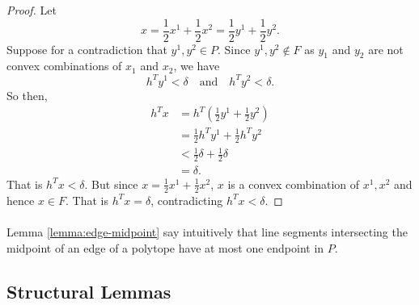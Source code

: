 \begin{proof}
Let $$x = \frac{1}{2}x^1 + \frac{1}{2} x^2 = \frac{1}{2} y^1 + \frac{1}{2}y^2.$$ Suppose for a contradiction that $y^1,y^2 \in P$. Since $y^1, y^2 \not\in F$ as $y_1$ and $y_2$ are not convex combinations of $x_1$ and $x_2$, we have
$$h^Ty^1 < \delta \quad\text{and}\quad h^Ty^2 < \delta. $$
So then,
\begin{align*}
h^Tx &= h^T(\frac{1}{2}y^1 + \frac{1}{2}y^2) \\
&= \frac{1}{2}h^Ty^1 + \frac{1}{2}h^Ty^2 \\
&< \frac{1}{2}\delta + \frac{1}{2}\delta \\
&= \delta.
\end{align*}
That is $h^T x < \delta$. But since $x = \frac{1}{2} x^1 + \frac{1}{2}x^2$, $x$ is a convex combination of $x^1, x^2$ and hence $x \in F$. That is $h^T x = \delta$, contradicting $h^T x < \delta$.
\end{proof}
\paragraph{}
Lemma \ref{lemma:edge-midpoint} say intuitively that line segments intersecting the midpoint of an edge of a polytope have at most one endpoint in $P$.
\subsection{Structural Lemmas}
